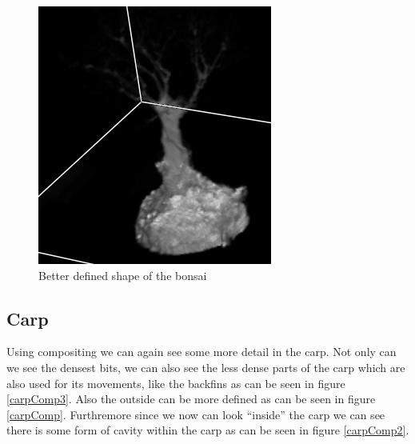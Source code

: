 \documentclass[a4paper,twoside,11pt]{article}
\begin{document}
  \begin{figure}[h]
 \centering
 \includegraphics[scale=0.7]{images/bonsaiComp2}
 \caption{Better defined shape of the bonsai}
 \label{bonsaiComp2}
 \end{figure}
 
 
 \subsection{Carp}
 Using compositing we can again see some more detail in the carp. Not only can we see the densest bits, we can also see the less dense parts of the carp which are also used for its movements, like the backfins as can be seen in figure \ref{carpComp3}. Also the outside can be more defined as can be seen in figure \ref{carpComp}. Furthremore since we now can look ``inside'' the carp we can see there is some form of cavity within the carp as can be seen in figure \ref{carpComp2}.
 
\end{document}
